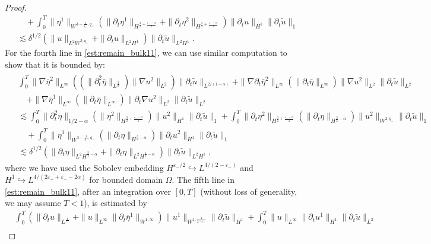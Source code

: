 \documentclass[letterpaper,reqno,10pt,twoside]{amsart}
\theoremstyle{definition}
\theoremstyle{remark}
\def\p{\partial}
\def\Om{\Omega}
\begin{document}
\begin{proof}
\begin{equation}
\begin{aligned}
					&\quad+\int_0^T\|\eta^{1}\|_{W^{3-\frac{1}{q_{-}},q_{-}}}(\|\p_{t}\eta^{1}\|_{H^{\frac{3}{2}+\frac{\varepsilon_{-}-\alpha}{2}}}+\|\p_{t}\eta^{2}\|_{H^{\frac{3}{2}+\frac{\varepsilon_{-}-\alpha}{2}}})\|\p_{t}u\|_{H^{1}}\|\p_t\tilde{u}\|_1\\
					&\lesssim \delta^{1/2}(\|u\|_{L^{2}W^{2,q_{+}}}+\|\p_{t}u\|_{L^{2}H^{1}})\|\p_t\tilde{u}\|_{L^2H^1}.
				\end{aligned}
			\end{equation}
			\noindent For the fourth line in \eqref{est:remain_bulk11}, we can use similar computation to show that it is bounded by:
			\begin{align}
				\begin{aligned}
					&\int_0^T\|\nabla\bar{\eta}^{2}\|_{L^{\infty}}((\|\p_{t}^{2}\bar{\eta}\|_{L^{\frac{2}{\alpha}}})\|\nabla{u}^{2}\|_{L^2}
					)\|\p_t\tilde{u}\|_{L^{2/(1-\alpha)}}+\|\nabla\p_{t}\bar{\eta}^{2}\|_{L^{\infty}}(\|\p_{t}\bar{\eta}\|_{L^{\infty}})\|\nabla{u}^{2}\|_{L^{2}}\|\p_t\tilde{u}\|_{L^{2}}\\
					&\quad+\|\nabla\bar{\eta}^{1}\|_{L^\infty}(\|\p_{t}\bar{\eta}\|_{L^{\infty}})\|\p_{t}\nabla{u}^{2}\|_{L^{2}}\|\p_t\tilde{u}\|_{L^{2}}\\
					&\lesssim \int_0^T\|\p_t^{2}\eta\|_{1/2-\alpha}(\|\eta^{2}\|_{H^{\frac{3}{2}+\frac{\varepsilon_{-}-\alpha}{2}}})\|u^{2}\|_{H^{1}}\|\p_t\tilde{u}\|_1+\int_0^T\|\p_t\eta^{2}\|_{H^{\frac{3}{2}+\frac{\varepsilon_{-}-\alpha}{2}}}(\|\p_{t}\eta\|_{H^{\frac{3}{2}-\alpha}})\|u^{2}\|_{W^{2,q_{-}}}\|\p_{t}\tilde{u}\|_1\\
					&\quad+\int_0^T\|\eta^{1}\|_{W^{3-\frac{1}{q_{-}},q_{-}}}(\|\p_{t}\eta\|_{H^{\frac{3}{2}-\alpha}})\|\p_{t}u^{2}\|_{H^{1}}\|\p_t\tilde{u}\|_1\\
					&\lesssim \delta^{1/2}(\|\p_{t}\eta\|_{L^{2}H^{\frac{3}{2}-\alpha}}+\|\p_{t}\eta\|_{L^{2}H^{\frac{1}{2}-\alpha}})\|\p_t\tilde{u}\|_{L^2H^1},
				\end{aligned}
			\end{align}
			where we have used the Sobolev embedding $H^{\varepsilon_-/2}\hookrightarrow L^{4/(2-\varepsilon_-)}$ and $H^1\hookrightarrow L^{4/(2\varepsilon_++\varepsilon_--2\alpha)}$ for bounded domain $\Om$.
			The fifth line in \eqref{est:remain_bulk11}, after an integration over $[0, T]$ (without loss of generality, we may assume $T<1$), is estimated by
			\begin{equation}\label{est:remain_bulk14}
				\begin{aligned}
					&\int_{0}^{T}(\|\p_{t}u\|_{L^{\frac{4}{\varepsilon_{-}}}}+\|u\|_{L^{\infty}}\|\p_{t}\bar\eta^{1}\|_{W^{1,\infty}})\|u^{1}\|_{W^{1,\frac{4}{2-\varepsilon_{-}}}}\|\p_{t}\tilde{u}\|_{H^{1}}+\int_{0}^{T}\|u\|_{L^{\infty}}\|\p_{t}u^{1}\|_{H^{1}}\|\p_{t}\tilde{u}\|_{L^{2}}\\

\end{aligned}
\end{equation}
\end{proof}
\end{document}
